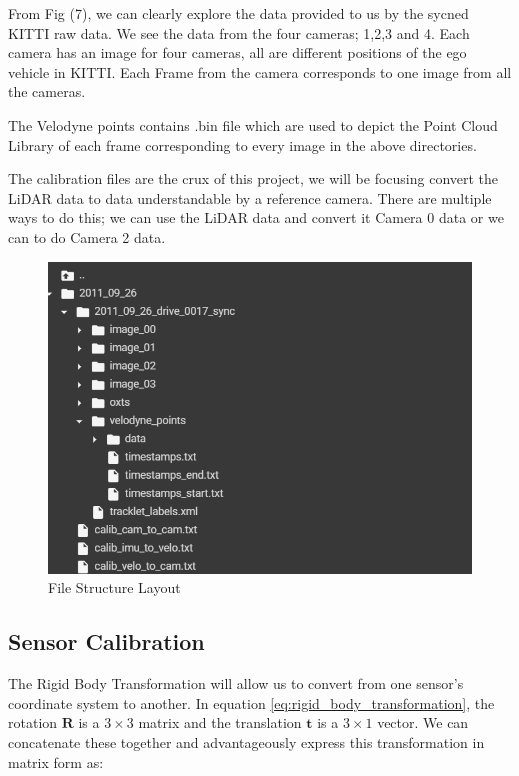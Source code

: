 \documentclass[letterpaper, 10 pt, conference]{ieeeconf}  %
\begin{document}
From Fig (7), we can clearly explore the data provided to us by the sycned KITTI raw data.
We see the data from the four cameras; 1,2,3 and 4. Each camera has an image for four cameras, all are different positions of the ego vehicle in KITTI.
Each Frame from the camera corresponds to one image from all the cameras. 

The Velodyne points contains .bin file which are used to depict the Point Cloud Library of each frame corresponding to every image in the above directories.

The calibration files are the crux of this project, we will be focusing convert the LiDAR data to data understandable by a reference camera.
There are multiple ways to do this; we can use the LiDAR data and convert it Camera 0 data or we can to do Camera 2 data.


\begin{figure}[htbp]
  \centering
  \includegraphics[width=\linewidth]{folder-struct.png}
  \caption{File Structure Layout}
  \label{File Structure Layout}
\end{figure}


\subsection{Sensor Calibration}

The Rigid Body Transformation will allow us to convert from one sensor's coordinate system to another. In equation \ref{eq:rigid_body_transformation}, the rotation \( \mathbf{R} \) is a \( 3 \times 3 \) matrix and the translation \( \mathbf{t} \) is a \( 3 \times 1 \) vector. We can concatenate these together and advantageously express this transformation in matrix form as:
\end{document}
